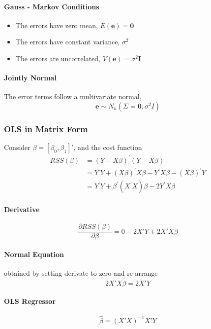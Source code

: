 \documentclass[10pt]{article}
\newcommand{\be}{\mathbf{e}}
\newcommand{\bzero}{\mathbf{0}}
\begin{document}
\paragraph{Gauss - Markov Conditions}
\begin{itemize}
    \item The errors have zero mean, $E(\be) = \bzero$
    \item The errors have constant variance, $\sigma^2$
    \item The errors are uncorrelated, $V(\be) = \sigma^2 \mathbf{I}$
\end{itemize}
\paragraph{Jointly Normal} The error terms follow a multivariate normal, 
\begin{equation*}
    \be \sim N_n (\Sigma = \bzero, \sigma^2 I)
\end{equation*}

\subsubsection{OLS in Matrix Form}
Consider $\beta = [\beta_0, \beta_1]'$, and the cost function
\begin{align*} 
    RSS(\beta) 
    &= ({Y}-{X} \beta)^{\prime}({Y}-{X} \beta) \\
    &={Y}^{\prime} {Y}+({X} \beta)^{\prime} {X} {\beta}-{Y}^{\prime} {X} {\beta}-({X} {\beta})^{\prime} {Y} \\ 
    &={Y}^{\prime} {Y}+\beta^{\prime}\left({X}^{\prime} {X}\right) \beta-2 {Y}^{\prime} {X} {\beta} 
\end{align*}
\paragraph{Derivative}
\begin{equation*}
    \frac{\partial RSS(\beta)}{\partial \beta} = 0 - 2X'Y + 2X'X\beta
\end{equation*}
\paragraph{Normal Equation} obtained by setting derivate to zero and re-arrange
\begin{equation*}
    2X'X\hat{\beta} = 2X'Y
\end{equation*}
\paragraph{OLS Regressor}
\begin{equation*}
    \hat{\beta} = (X'X)^{-1}X'Y
\end{equation*}
\end{document}
